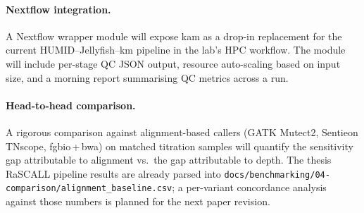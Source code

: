 \paragraph{Nextflow integration.}
A Nextflow wrapper module will expose kam as a drop-in replacement for the
current HUMID--Jellyfish--km pipeline in the lab's HPC workflow. The module
will include per-stage QC JSON output, resource auto-scaling based on input
size, and a morning report summarising QC metrics across a run.

\paragraph{Head-to-head comparison.}
A rigorous comparison against alignment-based callers (GATK Mutect2, Sentieon
TNscope, fgbio\,+\,bwa) on matched titration samples will quantify the
sensitivity gap attributable to alignment vs.\ the gap attributable to depth.
The thesis RaSCALL pipeline results are already parsed into
\texttt{docs/benchmarking/04-comparison/alignment\_baseline.csv}; a per-variant
concordance analysis against those numbers is planned for the next paper
revision.

